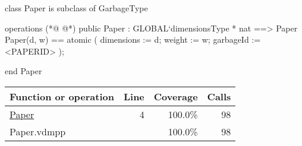 \begin{vdmpp}[breaklines=true]
class Paper is subclass of GarbageType

operations
(*@
\label{Paper:4}
@*)
public Paper : GLOBAL`dimensionsType * nat ==> Paper
Paper(d, w) == 
    atomic 
    (
        dimensions := d;
        weight := w;
        garbageId := <PAPERID>
    );


end Paper
\end{vdmpp}
\bigskip
\begin{longtable}{|l|r|r|r|}
\hline
Function or operation & Line & Coverage & Calls \\
\hline
\hline
\hyperref[Paper:4]{Paper} & 4&100.0\% & 98 \\
\hline
\hline
Paper.vdmpp & & 100.0\% & 98 \\
\hline
\end{longtable}

